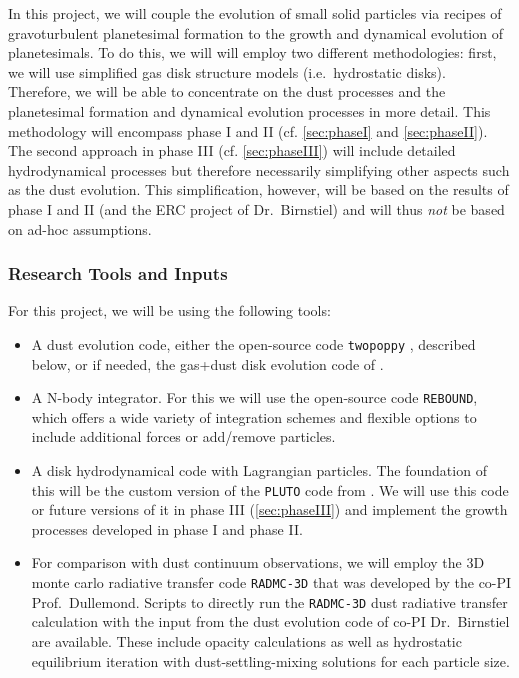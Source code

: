 \documentclass[10pt,fleqn,twoside]{article}
\newcommand{\twopoppy}{\texttt{twopoppy}\xspace}
\newcommand{\rebound}{\texttt{REBOUND}\xspace}
\newcommand{\pluto}{\texttt{PLUTO}\xspace}
\newcommand{\radmc}{\texttt{RADMC-3D}\xspace}
\begin{document}
In this project, we will couple the evolution of small solid particles
via recipes of gravoturbulent planetesimal formation to the growth and
dynamical evolution of planetesimals. To do this, we will will employ
two different methodologies: first, we will use simplified gas disk
structure models (i.e.\ hydrostatic disks). Therefore, we will be able
to concentrate on the dust processes and the planetesimal formation
and dynamical evolution processes in more detail. This methodology
will encompass phase I and II (cf. \autoref{sec:phaseI} and
\autoref{sec:phaseII}). The second approach in phase III (cf.
\autoref{sec:phaseIII}) will include detailed hydrodynamical processes
but therefore necessarily simplifying other aspects such as the dust
evolution. This simplification, however, will be based on the results
of phase I and II (and the ERC project of Dr.\ Birnstiel) and will thus
\textit{not} be based on ad-hoc assumptions.

\subsubsection{Research Tools and Inputs}
For this project, we will be using the following tools:

\begin{itemize}
  \item A dust evolution code, either the open-source code \twopoppy
  \citep{2012A&A...539A.148B}, described below, or if needed, the
  gas+dust disk evolution code of \citet{2010A&A...513A..79B}.
  \item A N-body integrator. For this we will use the open-source code
  \rebound, which offers a wide variety of integration schemes and
  flexible options to include additional forces or add/remove
  particles.
  \item A disk hydrodynamical code with Lagrangian particles. The
  foundation of this will be the custom version of the \pluto code
  from \citep{2015A&A...584A.110P}. We will use this code or future
  versions of it in phase III (\autoref{sec:phaseIII}) and implement
  the growth processes developed in phase I and phase II.
  \item For comparison with dust continuum observations, we will
  employ the 3D monte carlo radiative transfer code \radmc that was
  developed by the co-PI Prof.\ Dullemond. Scripts to directly run the
  \radmc dust radiative transfer calculation with the input from the
  dust evolution code of co-PI Dr.\ Birnstiel are available. These
  include opacity calculations as well as hydrostatic equilibrium
  iteration with dust-settling-mixing solutions for each particle
  size.
\end{itemize}
\end{document}
